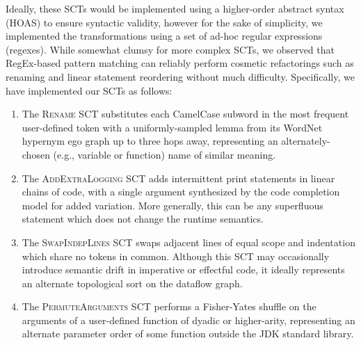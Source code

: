 \documentclass[usenames,dvipsnames]{article} %
\begin{document}
  Ideally, these SCTs would be implemented using a higher-order abstract syntax (HOAS) to ensure syntactic validity, however for the sake of simplicity, we implemented the transformations using a set of ad-hoc regular expressions (regexes). While somewhat clumsy for more complex SCTs, we observed that RegEx-based pattern matching can reliably perform cosmetic refactorings such as renaming and linear statement reordering without much difficulty. Specifically, we have implemented our SCTs as follows:

  \begin{enumerate}[itemsep=1ex]
    \item The \textsc{Rename} SCT substitutes each CamelCase subword in the most frequent user-defined token with a uniformly-sampled lemma from its WordNet hypernym ego graph up to three hops away, representing an alternately-chosen (e.g., variable or function) name of similar meaning.
    \item The \textsc{AddExtraLogging} SCT adds intermittent print statements in linear chains of code, with a single argument synthesized by the code completion model for added variation. More generally, this can be any superfluous statement which does not change the runtime semantics.
    \item The \textsc{SwapIndepLines} SCT swaps adjacent lines of equal scope and indentation which share no tokens in common. Although this SCT may occasionally introduce semantic drift in imperative or effectful code, it ideally represents an alternate topological sort on the dataflow graph.
    \item The \textsc{PermuteArguments} SCT performs a Fisher-Yates shuffle on the arguments of a user-defined function of dyadic or higher-arity, representing an alternate parameter order of some function outside the JDK standard library.
  \end{enumerate}

\end{document}
